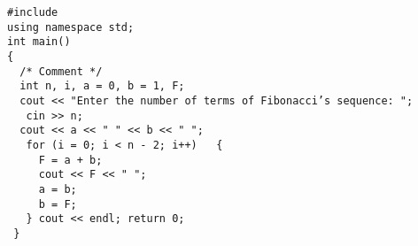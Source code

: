 \documentclass[a4paper]{article}
\begin{document}
\begin{lstlisting}
#include 
using namespace std;
int main()
{
  /* Comment */
  int n, i, a = 0, b = 1, F;
  cout << "Enter the number of terms of Fibonacci’s sequence: ";
   cin >> n;
  cout << a << " " << b << " ";
   for (i = 0; i < n - 2; i++)   {
     F = a + b;
     cout << F << " ";
     a = b;
     b = F;
   } cout << endl; return 0;
 } \end{lstlisting}
\end{document}
